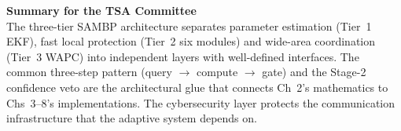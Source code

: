 \documentclass[12pt,a4paper]{article}
\begin{document}
\vspace{1em}
\begin{tcolorbox}[colback=iitmnavy!5,colframe=iitmnavy,arc=3pt,boxrule=1pt]
\small\centering
\textbf{Summary for the TSA Committee}\\[3pt]
The three-tier SAMBP architecture separates parameter estimation (Tier~1 EKF),
fast local protection (Tier~2 six modules) and wide-area coordination (Tier~3 WAPC)
into independent layers with well-defined interfaces.  The common three-step pattern
(query $\to$ compute $\to$ gate) and the Stage-2 confidence veto are the architectural
glue that connects Ch~2's mathematics to Chs~3--8's implementations.  The
cybersecurity layer protects the communication infrastructure that the adaptive
system depends on.
\end{tcolorbox}
\end{document}

